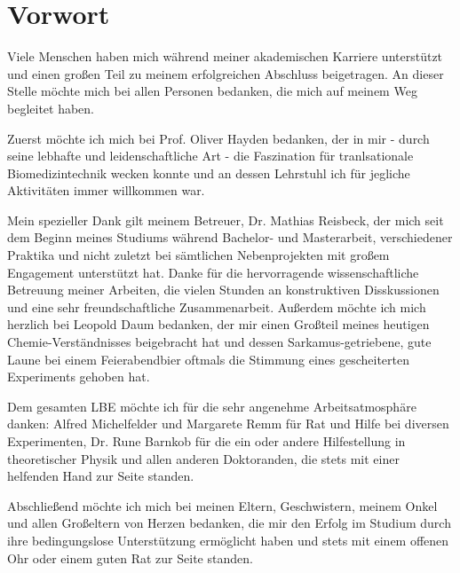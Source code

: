 \chapter*{Vorwort}
\thispagestyle{empty}
Viele Menschen haben mich während meiner akademischen Karriere unterstützt und einen großen Teil zu meinem erfolgreichen Abschluss beigetragen.  An dieser Stelle möchte mich bei allen Personen bedanken, die mich auf meinem Weg begleitet haben.

Zuerst möchte ich mich bei Prof. Oliver Hayden bedanken, der in mir - durch seine lebhafte und leidenschaftliche Art - die Faszination für tranlsationale Biomedizintechnik wecken konnte und an dessen Lehrstuhl ich für jegliche Aktivitäten immer willkommen war.

Mein spezieller Dank gilt meinem Betreuer, Dr. Mathias Reisbeck, der mich seit dem Beginn meines Studiums während Bachelor- und Masterarbeit, verschiedener Praktika und nicht zuletzt bei sämtlichen Nebenprojekten mit großem Engagement unterstützt hat. Danke für die hervorragende wissenschaftliche Betreuung meiner Arbeiten, die vielen Stunden an konstruktiven Disskussionen und eine sehr freundschaftliche Zusammenarbeit. Außerdem möchte ich mich herzlich bei Leopold Daum bedanken, der mir einen Großteil meines heutigen Chemie-Verständnisses beigebracht hat und dessen Sarkamus-getriebene, gute Laune bei einem Feierabendbier oftmals die Stimmung eines gescheiterten Experiments gehoben hat.

Dem gesamten LBE möchte ich für die sehr angenehme Arbeitsatmosphäre danken: Alfred Michelfelder und Margarete Remm für Rat und Hilfe bei diversen Experimenten, Dr. Rune Barnkob für die ein oder andere Hilfestellung in theoretischer Physik und allen anderen Doktoranden, die stets mit einer helfenden Hand zur Seite standen.

Abschließend möchte ich mich bei meinen Eltern, Geschwistern, meinem Onkel und allen Großeltern von Herzen bedanken, die mir den Erfolg im Studium durch ihre bedingungslose Unterstützung ermöglicht haben und stets mit einem offenen Ohr oder einem guten Rat zur Seite standen.